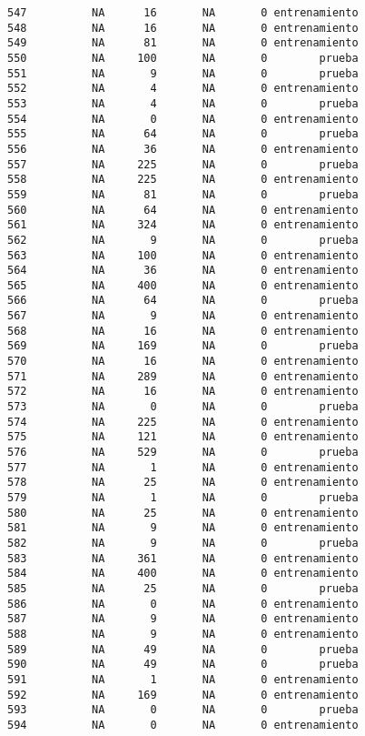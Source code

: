 \documentclass[
  letterpaper,
  DIV=11,
  numbers=noendperiod]{scrreprt}
\begin{document}
\begin{verbatim}
547          NA      16       NA       0 entrenamiento
548          NA      16       NA       0 entrenamiento
549          NA      81       NA       0 entrenamiento
550          NA     100       NA       0        prueba
551          NA       9       NA       0        prueba
552          NA       4       NA       0 entrenamiento
553          NA       4       NA       0        prueba
554          NA       0       NA       0 entrenamiento
555          NA      64       NA       0        prueba
556          NA      36       NA       0 entrenamiento
557          NA     225       NA       0        prueba
558          NA     225       NA       0 entrenamiento
559          NA      81       NA       0        prueba
560          NA      64       NA       0 entrenamiento
561          NA     324       NA       0 entrenamiento
562          NA       9       NA       0        prueba
563          NA     100       NA       0 entrenamiento
564          NA      36       NA       0 entrenamiento
565          NA     400       NA       0 entrenamiento
566          NA      64       NA       0        prueba
567          NA       9       NA       0 entrenamiento
568          NA      16       NA       0 entrenamiento
569          NA     169       NA       0        prueba
570          NA      16       NA       0 entrenamiento
571          NA     289       NA       0 entrenamiento
572          NA      16       NA       0 entrenamiento
573          NA       0       NA       0        prueba
574          NA     225       NA       0 entrenamiento
575          NA     121       NA       0 entrenamiento
576          NA     529       NA       0        prueba
577          NA       1       NA       0 entrenamiento
578          NA      25       NA       0 entrenamiento
579          NA       1       NA       0        prueba
580          NA      25       NA       0 entrenamiento
581          NA       9       NA       0 entrenamiento
582          NA       9       NA       0        prueba
583          NA     361       NA       0 entrenamiento
584          NA     400       NA       0 entrenamiento
585          NA      25       NA       0        prueba
586          NA       0       NA       0 entrenamiento
587          NA       9       NA       0 entrenamiento
588          NA       9       NA       0 entrenamiento
589          NA      49       NA       0        prueba
590          NA      49       NA       0        prueba
591          NA       1       NA       0 entrenamiento
592          NA     169       NA       0 entrenamiento
593          NA       0       NA       0        prueba
594          NA       0       NA       0 entrenamiento

\end{verbatim}
\end{document}
